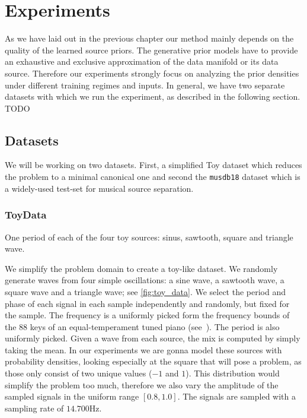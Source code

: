 \chapter{Experiments}%
\label{ch:experiments}
As we have laid out in the previous chapter our method mainly depends on the quality of the learned source priors. The generative prior models have to provide an exhaustive and exclusive approximation of the data manifold or its data source. Therefore our experiments strongly focus on analyzing the prior densities under different training regimes and inputs. In general, we have two separate datasets with which we run the experiment, as described in the following section. TODO


\section{Datasets}
We will be working on two datasets. First, a simplified Toy dataset which reduces the problem to a minimal canonical one and second the \texttt{musdb18} dataset which is a widely-used test-set for musical source separation.

\subsection{ToyData}
\begin{marginfigure}[5em]
    \resizebox{\textwidth}{!}{%
    }%
    \caption{One period of each of the four toy sources: sinus, sawtooth, square and triangle wave.}%
    \label{fig:toy_data}
\end{marginfigure}

We simplify the problem domain to create a toy-like dataset. We randomly generate waves from four simple oscillations: a sine wave, a sawtooth wave, a square wave and a triangle wave; see \cref{fig:toy_data}.  We select the period and phase of each signal in each sample independently and randomly, but fixed for the sample. The frequency is a uniformly picked form the frequency bounds of the 88 keys of an equal-temperament tuned piano (see~). The period is also uniformly picked. Given a wave from each source, the mix is computed by simply taking the mean. In our experiments we are gonna model these sources with probability densities, looking especially at the square that will pose a problem, as those only consist of two unique values (\(-1\) and \(1\)). This distribution would simplify the problem too much, therefore we also vary the amplitude of the sampled signals in the uniform range \([0.8, 1.0]\). The signals are sampled with a sampling rate of \(14.700 \si{\Hz}\).

